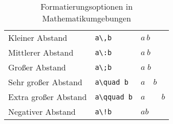 \begin{table}[H]
\begin{tabular}{lll}
        Kleiner Abstand                      & \texttt{a\textbackslash ,b}                         & \( a\,b \)               \\
        Mittlerer Abstand                    & \texttt{a\textbackslash :b}                         & \( a\: b \)              \\
        Großer Abstand                       & \texttt{a\textbackslash ;b}                         & \( a\;b \)               \\
        Sehr großer Abstand                  & \texttt{a\textbackslash quad b}                     & \( a \quad b \)          \\
        Extra großer Abstand                 & \texttt{a\textbackslash qquad b}                    & \( a \qquad b \)         \\
        Negativer Abstand                    & \texttt{a\textbackslash!b}                          & \( a\!b \)               \\
        \bottomrule
    \end{tabular}
    \caption{Formatierungsoptionen in Mathematikumgebungen}
    \label{tab:math_formatierung}
\end{table}
